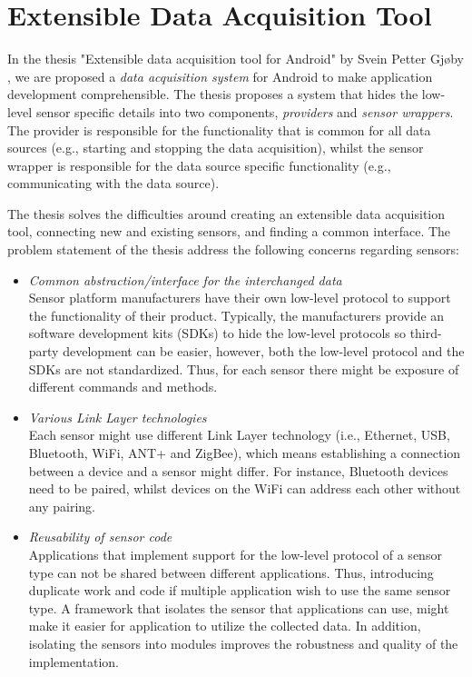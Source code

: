 \section{Extensible Data Acquisition Tool}
In the thesis "Extensible data acquisition tool for Android" by Svein Petter Gjøby \cite{gjoby}, we are proposed a \textit{data acquisition system} for Android to make application development comprehensible. The thesis proposes a system that hides the low-level sensor specific details into two components, \textit{providers} and \textit{sensor wrappers}. The provider is responsible for the functionality that is common for all data sources (e.g., starting and stopping the data acquisition), whilst the sensor wrapper is responsible for the data source specific functionality (e.g., communicating with the data source).

The thesis solves the difficulties around creating an extensible data acquisition tool, connecting new and existing sensors, and finding a common interface. The problem statement of the thesis address the following concerns regarding sensors:
\begin{itemize}
    \item \textit{Common abstraction/interface for the interchanged data}\\ 
    Sensor platform manufacturers have their own low-level protocol to support the functionality of their product. Typically, the manufacturers provide an software development kits (SDKs) to hide the low-level protocols so third-party development can be easier, however, both the low-level protocol and the SDKs are not standardized. Thus, for each sensor there might be exposure of different commands and methods.
    \item \textit{Various Link Layer technologies} \\ 
    Each sensor might use different Link Layer technology (i.e., Ethernet, USB, Bluetooth, WiFi, ANT+ and ZigBee), which means establishing a connection between a device and a sensor might differ. For instance, Bluetooth devices need to be paired, whilst devices on the WiFi can address each other without any pairing. 
    \item \textit{Reusability of sensor code}\\
    Applications that implement support for the low-level protocol of a sensor type can not be shared between different applications. Thus, introducing duplicate work and code if multiple application wish to use the same sensor type. A framework that isolates the sensor that applications can use, might make it easier for application to utilize the collected data. In addition, isolating the sensors into modules improves the robustness and quality of the implementation. 
    
\end{itemize}

